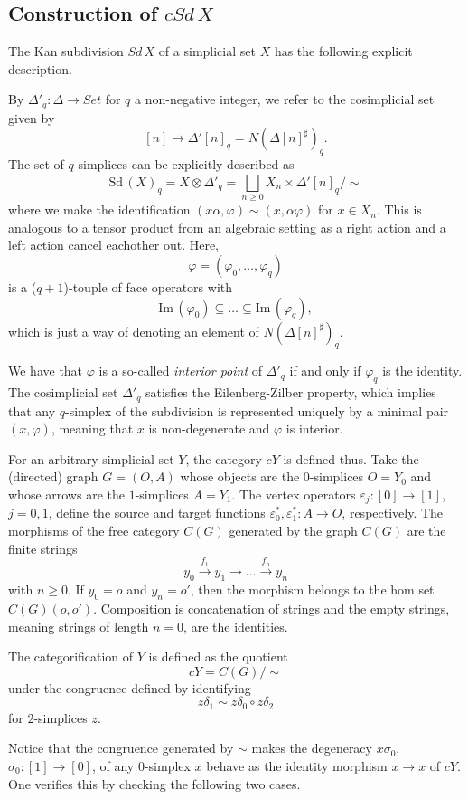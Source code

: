 \subsection{Construction of $cSd\, X$}


The Kan subdivision $Sd\, X$ of a simplicial set $X$ has the following explicit description.

By $\Delta '_q:\Delta \to Set$ for $q$ a non-negative integer, we refer to the cosimplicial set given by
\[[n]\mapsto \Delta '[n]_q=N(\Delta [n]^\sharp )_q.\]
The set of $q$-simplices can be explicitly described as
\[\textrm{Sd} \, (X)_q=X\otimes \Delta '_q=\bigsqcup _{n\geq 0}X_n\times \Delta '[n]_q/\sim\]
where we make the identification $(x\alpha ,\varphi )\sim (x,\alpha \varphi )$ for $x\in X_n$.  This is analogous to a tensor product from an algebraic setting as a right action and a left action cancel eachother out. Here,
\[\varphi =(\varphi _0,\dots ,\varphi _q)\]
is a ($q+1$)-touple of face operators with
\[\textrm{Im} \, (\varphi _0)\subseteq \dots \subseteq \textrm{Im} \, (\varphi _q),\]
which is just a way of denoting an element of $N(\Delta [n]^\sharp )_q$.

We have that $\varphi$ is a so-called \emph{interior point} of $\Delta '_q$ if and only if $\varphi _q$ is the identity. The cosimplicial set $\Delta '_q$ satisfies the Eilenberg-Zilber property, which implies that any $q$-simplex of the subdivision is represented uniquely by a minimal pair $(x,\varphi )$, meaning that $x$ is non-degenerate and $\varphi$ is interior.

For an arbitrary simplicial set $Y$, the category $cY$ is defined thus. Take the (directed) graph $G=(O,A)$ whose objects are the $0$-simplices $O=Y_0$ and whose arrows are the $1$-simplices $A=Y_1$. The vertex operators $\varepsilon _j:[0]\to [1]$, $j=0,1$, define the source and target functions $\varepsilon _0^*,\varepsilon _1^*:A\to O$, respectively. The morphisms of the free category $C(G)$ generated by the graph $C(G)$ are the finite strings
\[y_0\xrightarrow{f_1} y_1\to \dots \xrightarrow{f_n} y_n\]
with $n\geq 0$. If $y_0=o$ and $y_n=o'$, then the morphism belongs to the hom set $C(G)(o,o')$. Composition is concatenation of strings and the empty strings, meaning strings of length $n=0$, are the identities.

The categorification of $Y$ is defined as the quotient
\[cY=C(G)/\sim\]
under the congruence defined by identifying
\[z\delta _1\sim z\delta _0\circ z\delta _2\]
for $2$-simplices $z$.

Notice that the congruence generated by $\sim$ makes the degeneracy $x\sigma _0$, $\sigma _0:[1]\to [0]$, of any $0$-simplex $x$ behave as the identity morphism $x\to x$ of $cY$. One verifies this by checking the following two cases.

